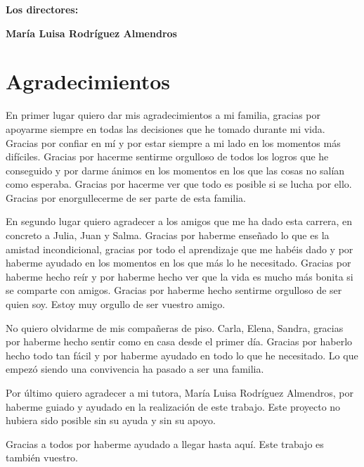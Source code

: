 \textbf{Los directores:}

\vspace{4cm}

\noindent \textbf{María Luisa Rodríguez Almendros}

\chapter*{Agradecimientos}
\thispagestyle{empty}

       \vspace{1cm}


En primer lugar quiero dar mis agradecimientos a mi familia, gracias por apoyarme siempre en todas las decisiones que he tomado
durante mi vida. Gracias por confiar en mí y por estar siempre a mi lado en los momentos más difíciles. Gracias por hacerme sentirme 
orgulloso de todos los logros que he conseguido y por darme ánimos en los momentos en los que las cosas no salían como esperaba.
Gracias por hacerme ver que todo es posible si se lucha por ello. Gracias por enorgullecerme de ser parte de esta familia.

En segundo lugar quiero agradecer a los amigos que me ha dado esta carrera, en concreto a Julia, Juan y Salma. Gracias por haberme enseñado 
lo que es la amistad incondicional, gracias por todo el aprendizaje que me habéis dado y por haberme ayudado en los momentos en los que más lo he necesitado.
Gracias por haberme hecho reír y por haberme hecho ver que la vida es mucho más bonita si se comparte con amigos. Gracias por haberme hecho sentirme 
orgulloso de ser quien soy. Estoy muy orgullo de ser vuestro amigo.

No quiero olvidarme de mis compañeras de piso. Carla, Elena, Sandra, gracias por haberme hecho sentir como en casa desde el primer día.
Gracias por haberlo hecho todo tan fácil y por haberme ayudado en todo lo que he necesitado. Lo que empezó siendo una convivencia ha pasado a ser una familia. 

Por último quiero agradecer a mi tutora, María Luisa Rodríguez Almendros, por haberme guiado y ayudado en la realización de este trabajo. Este proyecto
no hubiera sido posible sin su ayuda y sin su apoyo.

Gracias a todos por haberme ayudado a llegar hasta aquí. Este trabajo es también vuestro.